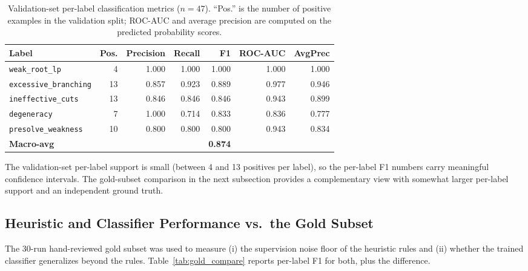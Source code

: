 \documentclass[11pt]{article}
\begin{document}
\begin{table}[h]
\centering
\begin{tabular}{lrrrrrr}
\toprule
\textbf{Label} & \textbf{Pos.} & \textbf{Precision} & \textbf{Recall} & \textbf{F1} & \textbf{ROC-AUC} & \textbf{AvgPrec} \\
\midrule
\texttt{weak\_root\_lp}        &  4 & 1.000 & 1.000 & 1.000 & 1.000 & 1.000 \\
\texttt{excessive\_branching}  & 13 & 0.857 & 0.923 & 0.889 & 0.977 & 0.946 \\
\texttt{ineffective\_cuts}     & 13 & 0.846 & 0.846 & 0.846 & 0.943 & 0.899 \\
\texttt{degeneracy}            &  7 & 1.000 & 0.714 & 0.833 & 0.836 & 0.777 \\
\texttt{presolve\_weakness}    & 10 & 0.800 & 0.800 & 0.800 & 0.943 & 0.834 \\
\midrule
\textbf{Macro-avg}             &    &       &       & \textbf{0.874} &       &       \\
\bottomrule
\end{tabular}
\caption{Validation-set per-label classification metrics ($n=47$). ``Pos.'' is the number of positive examples in the validation split; ROC-AUC and average precision are computed on the predicted probability scores.}
\label{tab:val_metrics}
\end{table}

The validation-set per-label support is small (between 4 and 13 positives per label), so the per-label F1 numbers carry meaningful confidence intervals. The gold-subset comparison in the next subsection provides a complementary view with somewhat larger per-label support and an independent ground truth.

\subsection{Heuristic and Classifier Performance vs.\ the Gold Subset}

The 30-run hand-reviewed gold subset was used to measure (i) the supervision noise floor of the heuristic rules and (ii) whether the trained classifier generalizes beyond the rules. Table~\ref{tab:gold_compare} reports per-label F1 for both, plus the difference.
\end{document}
